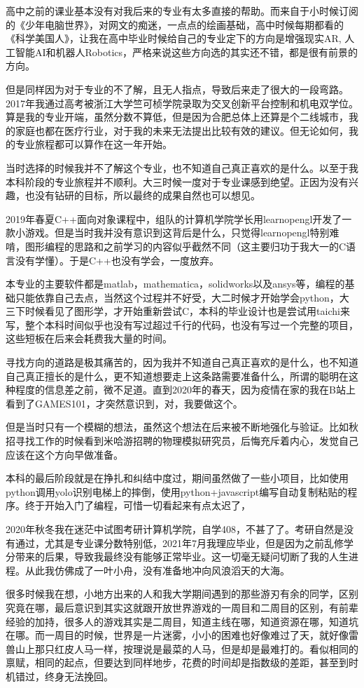 高中之前的课业基本没有对我后来的专业有太多直接的帮助。而来自于小时候订阅的《少年电脑世界》，对网文的痴迷，一点点的绘画基础，高中时候每期都看的《科学美国人》，让我在高中毕业时候给自己的专业定下的方向是增强现实AR, 人工智能AI和机器人Robotics，严格来说这些方向选的其实还不错，都是很有前景的方向。

但是同样因为对于专业的不了解，且无人指点，导致后来走了很大的一段弯路。2017年我通过高考被浙江大学竺可桢学院录取为交叉创新平台控制和机电双学位。算是我的专业开端，虽然分数不算低，但是因为合肥总体上还算是个二线城市，我的家庭也都在医疗行业，对于我的未来无法提出比较有效的建议。但无论如何，我的专业旅程都可以算作在这一年开始。

当时选择的时候我并不了解这个专业，也不知道自己真正喜欢的是什么。以至于我本科阶段的专业旅程并不顺利。大三时候一度对于专业课感到绝望。正因为没有兴趣，也没有钻研的目标，所以最终的成果自然也可以想见。

2019年春夏C++面向对象课程中，组队的计算机学院学长用learnopengl开发了一款小游戏。但是当时我并没有意识到这背后是什么，只觉得learnopengl特别难啃，图形编程的思路和之前学习的内容似乎截然不同（这主要归功于我大一的C语言没有学懂）。于是C++也没有学会，一度放弃。

本专业的主要软件都是matlab，mathematica，solidworks以及ansys等，编程的基础只能依靠自己去点，当然这个过程并不好受，大二时候才开始学会python，大三下时候看见了图形学，才开始重新尝试C，本科的毕业设计也是尝试用taichi来写，整个本科时间似乎也没有写过超过千行的代码，也没有写过一个完整的项目，这些短板在后来会耗费我大量的时间。

寻找方向的道路是极其痛苦的，因为我并不知道自己真正喜欢的是什么，也不知道自己真正擅长的是什么，更不知道想要走上这条路需要准备什么，所谓的聪明在这种程度的信息差之前，微不足道。直到2020年的春天，因为疫情在家的我在B站上看到了GAMES101，才突然意识到，对，我要做这个。

但是当时只有一个模糊的想法，虽然这个想法在后来被不断地强化与验证。比如秋招寻找工作的时候看到米哈游招聘的物理模拟研究员，后悔充斥着内心，发觉自己应该在这个方向早做准备。

本科的最后阶段就是在挣扎和纠结中度过，期间虽然做了一些小项目，比如使用python调用yolo识别电梯上的摔倒，使用python+javascript编写自动复制粘贴的程序。终于开始入门了编程，可惜一切看起来有点太迟了，

2020年秋冬我在迷茫中试图考研计算机学院，自学408，不甚了了。考研自然是没有通过，尤其是专业课分数特别低，2021年7月我理应毕业，但是因为之前乱修学分带来的后果，导致我最终没有能够正常毕业。这一切毫无疑问切断了我的人生进程。从此我仿佛成了一叶小舟，没有准备地冲向风浪滔天的大海。

很多时候我在想，小地方出来的人和我大学期间遇到的那些游刃有余的同学，区别究竟在哪，最后意识到其实这就跟开放世界游戏的一周目和二周目的区别，有前辈经验的加持，很多人的游戏其实是二周目，知道主线在哪，知道资源在哪，知道坑在哪。而一周目的时候，世界是一片迷雾，小小的困难也好像难过了天，就好像雷兽山上那只红皮人马一样，按理说是最菜的人马，但是却是最难打的。看似相同的禀赋，相同的起点，但要达到同样地步，花费的时间却是指数级的差距，甚至到时机错过，终身无法挽回。


